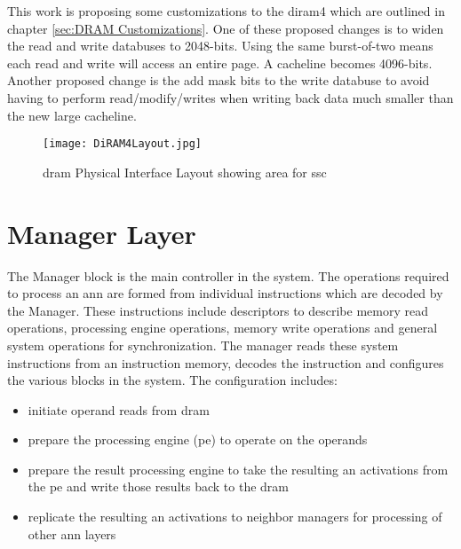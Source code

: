 This work is proposing some customizations to the \ac{diram4} which are outlined in chapter \ref{sec:DRAM Customizations}. One of these proposed changes is to widen the read and write databuses to 2048-bits.
Using the same burst-of-two means each read and write will access an entire page. A cacheline becomes 4096-bits.
Another proposed change is the add mask bits to the write databuse to avoid having to perform read/modify/writes when writing back data much smaller than the new large cacheline.

\begin{figure}[!t]
\centering
\captionsetup{justification=centering}
\captionsetup{width=.9\linewidth}
\centerline{
\mbox{\texttt{[image: DiRAM4Layout.jpg]}}
}
\caption{\ac{dram} Physical Interface Layout showing area for \ac{ssc}}
\label{fig:diram4Layout}
\end{figure}


\section{Manager Layer}
The Manager block is the main controller in the system. The operations required to process an \ac{ann} are formed from individual instructions which are decoded by the Manager. 
These instructions include descriptors to describe memory read operations, processing engine operations, memory write operations and general system operations for synchronization. 
The manager reads these system instructions from an instruction memory, decodes the instruction and configures the various blocks in the system.
The configuration includes:
\begin{itemize}
      \item initiate operand reads from \ac{dram}
      \item prepare the processing engine (\ac{pe}) to operate on the operands
      \item prepare the result processing engine to take the resulting \ac{an} activations from the \ac{pe} and write those results back to the \ac{dram}
      \item replicate the resulting \ac{an} activations to neighbor managers for processing of other \ac{ann} layers
\end{itemize}

